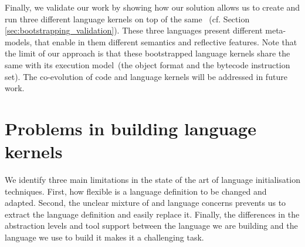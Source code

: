 %
Finally, we validate our work by showing how our solution allows us to create and run three different language kernels on top of the same \VM~(cf. Section \ref{sec:bootstrapping_validation}). These three languages present different meta-models, that enable in them different semantics and reflective features. Note that the limit of our approach is that these bootstrapped language kernels share the same \VM with its execution model~(\eg the object format and the bytecode instruction set). The co-evolution of \VM code and language kernels will be addressed in future work.

\section{Problems in building language kernels} \label{sec:bootstrapping_problems}

We identify three main limitations in the state of the art of language initialisation techniques. First, how flexible is a language definition to be changed and adapted. Second, the unclear mixture of \VM and language concerns prevents us to extract the language definition and easily replace it. Finally, the differences in the abstraction levels and tool support between the language we are building and the language we use to build it makes it a challenging task.



